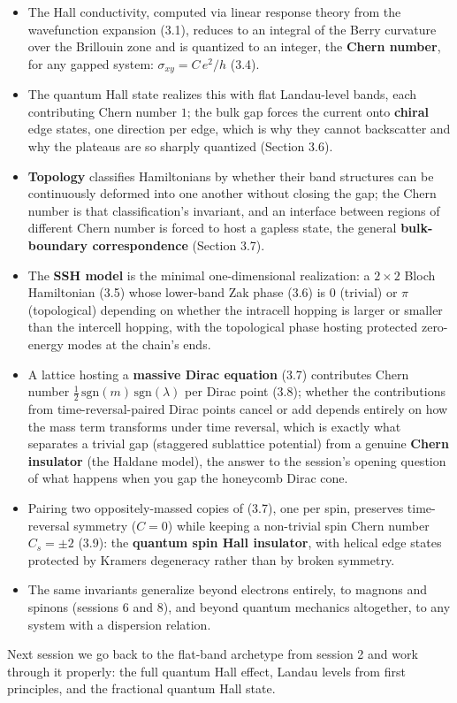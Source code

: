 \begin{itemize}
\item The Hall conductivity, computed via linear response theory from the wavefunction expansion (3.1),
  reduces to an integral of the Berry curvature over the Brillouin zone and is quantized to an
  integer, the \textbf{Chern number}, for any gapped system: $\sigma_{xy} = C\,e^2/h$ (3.4).
\item The quantum Hall state realizes this with flat Landau-level bands, each contributing Chern number
  $1$; the bulk gap forces the current onto \textbf{chiral} edge states, one direction per edge, which is
  why they cannot backscatter and why the plateaus are so sharply quantized (Section 3.6).
\item \textbf{Topology} classifies Hamiltonians by whether their band structures can be continuously deformed
  into one another without closing the gap; the Chern number is that classification's invariant, and
  an interface between regions of different Chern number is forced to host a gapless state, the
  general \textbf{bulk-boundary correspondence} (Section 3.7).
\item The \textbf{SSH model} is the minimal one-dimensional realization: a $2\times 2$ Bloch Hamiltonian (3.5)
  whose lower-band Zak phase (3.6) is $0$ (trivial) or $\pi$ (topological) depending on whether the
  intracell hopping is larger or smaller than the intercell hopping, with the topological phase
  hosting protected zero-energy modes at the chain's ends.
\item A lattice hosting a \textbf{massive Dirac equation} (3.7) contributes Chern number $\tfrac12\,
  \mathrm{sgn}(m)\,\mathrm{sgn}(\lambda)$ per Dirac point (3.8); whether the contributions from
  time-reversal-paired Dirac points cancel or add depends entirely on how the mass term transforms
  under time reversal, which is exactly what separates a trivial gap (staggered sublattice potential)
  from a genuine \textbf{Chern insulator} (the Haldane model), the answer to the session's opening
  question of what happens when you gap the honeycomb Dirac cone.
\item Pairing two oppositely-massed copies of (3.7), one per spin, preserves time-reversal symmetry
  ($C=0$) while keeping a non-trivial spin Chern number $C_s=\pm2$ (3.9): the \textbf{quantum spin Hall
  insulator}, with helical edge states protected by Kramers degeneracy rather than by broken
  symmetry.
\item The same invariants generalize beyond electrons entirely, to magnons and spinons (sessions 6 and
  8), and beyond quantum mechanics altogether, to any system with a dispersion relation.
\end{itemize}

Next session we go back to the flat-band archetype from session 2 and work through it properly: the
full quantum Hall effect, Landau levels from first principles, and the fractional quantum Hall state.
